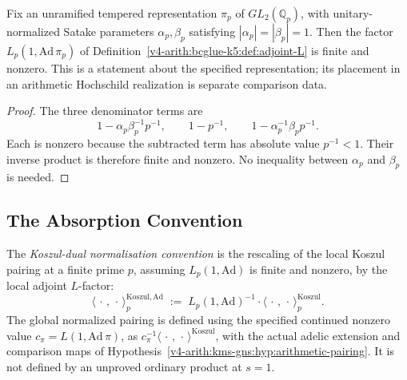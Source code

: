\begin{lemma}
\label{v4-arith:bcglue-k5:lem:Lp-1-well-defined}
Fix an unramified tempered representation \(\pi_p\) of
\(GL_2(\mathbb Q_p)\), with unitary-normalized Satake parameters
\(\alpha_p,\beta_p\) satisfying \(|\alpha_p|=|\beta_p|=1\).
Then the factor \(L_p(1,\mathrm{Ad}\,\pi_p)\) of
Definition~\ref{v4-arith:bcglue-k5:def:adjoint-L} is finite and nonzero.
This is a statement about the specified representation; its placement
in an arithmetic Hochschild realization is separate comparison data.
\end{lemma}
\begin{proof}
The three denominator terms are
\[
 1-\alpha_p\beta_p^{-1}p^{-1},\qquad
 1-p^{-1},\qquad
 1-\alpha_p^{-1}\beta_p p^{-1}.
\]
Each is nonzero because the subtracted term has absolute value
\(p^{-1}<1\). Their inverse product is therefore finite and nonzero.
No inequality between \(\alpha_p\) and \(\beta_p\) is needed.
\end{proof}

\subsection{The Absorption Convention}

\begin{definition}
\label{v4-arith:bcglue-k5:def:koszul-dual-norm}
The \emph{Koszul-dual normalisation convention} is the rescaling
of the local Koszul pairing at a finite prime \(p\), assuming
\(L_p(1,\mathrm{Ad})\) is finite and nonzero, by the local
adjoint \(L\)-factor:
\begin{equation}
\label{v4-arith:bcglue-k5:eq:koszul-dual-norm}
\langle\,\cdot\,,\,\cdot\,\rangle^{\mathrm{Koszul,Ad}}_{p}
\;:=\;
L_{p}(1,\mathrm{Ad})^{-1}\cdot\langle\,\cdot\,,\,\cdot\,\rangle^{\mathrm{Koszul}}_{p}.
\end{equation}
The global normalized pairing is defined using the specified
continued nonzero value \(c_\pi=L(1,\mathrm{Ad}\,\pi)\), as
\(c_\pi^{-1}\langle\,\cdot\,,\,\cdot\,\rangle^{\mathrm{Koszul}}\),
with the actual adelic extension and comparison maps of
Hypothesis~\ref{v4-arith:kms-gns:hyp:arithmetic-pairing}.
It is not defined by an unproved ordinary product at \(s=1\).
\end{definition}


